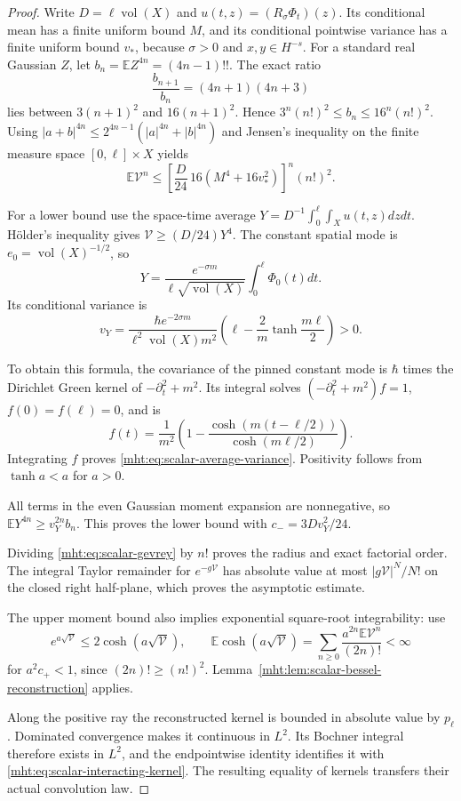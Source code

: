 \begin{proof}
Write $D=\ell\operatorname{vol}(X)$ and
$u(t,z)=(R_\sigma\Phi_t)(z)$. Its conditional mean has a finite
uniform bound $M$, and its conditional pointwise variance has a
finite uniform bound $v_*$, because $\sigma>0$ and $x,y\in H^{-s}$.
For a standard real Gaussian $Z$, let $b_n=\mathbb E Z^{4n}=(4n-1)!!$.
The exact ratio
\[
 \frac{b_{n+1}}{b_n}=(4n+1)(4n+3)
\]
lies between $3(n+1)^2$ and $16(n+1)^2$. Hence
$3^n(n!)^2\leq b_n\leq16^n(n!)^2$.
Using $|a+b|^{4n}\leq2^{4n-1}(|a|^{4n}+|b|^{4n})$ and Jensen's
inequality on the finite measure space $[0,\ell]\times X$ yields
\[
 \mathbb E \mathcal V^n\leq
 \left[\frac{D}{24}\,16(M^4+16v_*^2)\right]^n(n!)^2.
\]

For a lower bound use the space-time average
$Y=D^{-1}\int_0^\ell\int_Xu(t,z)dzdt$.
H\"older's inequality gives $\mathcal V\geq(D/24)Y^4$.
The constant spatial mode is $e_0=\operatorname{vol}(X)^{-1/2}$, so
\[
 Y=\frac{e^{-\sigma m}}{\ell\sqrt{\operatorname{vol}(X)}}
                        \int_0^\ell\Phi_0(t)dt.
\]
Its conditional variance is
\begin{equation}\label{mht:eq:scalar-average-variance}
 v_Y=\frac{\hbar e^{-2\sigma m}}{\ell^2\operatorname{vol}(X)m^2}
       \left(\ell-\frac2m\tanh\frac{m\ell}{2}\right)>0.
\end{equation}

To obtain this formula, the covariance of the pinned constant mode
is $\hbar$ times the Dirichlet Green kernel of
$-\partial_t^2+m^2$. Its integral solves
$(-\partial_t^2+m^2)f=1$, $f(0)=f(\ell)=0$, and is
\[
 f(t)=\frac1{m^2}
       \left(1-\frac{\cosh(m(t-\ell/2))}{\cosh(m\ell/2)}\right).
\]
Integrating $f$ proves \eqref{mht:eq:scalar-average-variance}.
Positivity follows from $\tanh a<a$ for $a>0$.

All terms in the even Gaussian moment expansion are nonnegative,
so $\mathbb E Y^{4n}\geq v_Y^{2n}b_n$.
This proves the lower bound with $c_-=3Dv_Y^2/24$.

Dividing \eqref{mht:eq:scalar-gevrey} by $n!$ proves the radius and exact
factorial order. The integral Taylor remainder for $e^{-g\mathcal V}$ has
absolute value at most $|g\mathcal V|^N/N!$ on the closed right half-plane,
which proves the asymptotic estimate.

The upper moment bound also implies exponential square-root
integrability: use
\[
 e^{a\sqrt{\mathcal V}}\leq2\cosh(a\sqrt{\mathcal V}),\qquad
 \mathbb E\cosh(a\sqrt{\mathcal V})
 =\sum_{n\geq0}\frac{a^{2n}\mathbb E \mathcal V^n}{(2n)!}<\infty
\]
for $a^2c_+<1$, since $(2n)!\geq(n!)^2$.
Lemma~\ref{mht:lem:scalar-bessel-reconstruction} applies.

Along the positive ray the reconstructed kernel is bounded in
absolute value by $p_\ell$. Dominated convergence makes it continuous
in $L^2$. Its Bochner integral therefore exists
in $L^2$, and the endpointwise identity identifies it with
\eqref{mht:eq:scalar-interacting-kernel}. The resulting equality of kernels transfers
their actual convolution law.
\end{proof}


